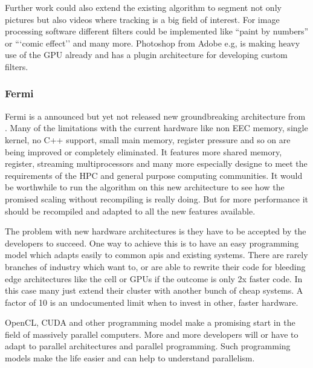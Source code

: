 Further work could also extend the existing algorithm to segment not only pictures 
but also videos where tracking is a big field of interest. For image processing
software different filters could be implemented like ``paint by numbers'' or 
```comic effect'' and many more. Photoshop  from Adobe e.g, is making heavy
use of the \gls{GPU} already and has a plugin architecture for developing custom
filters.  
 
\subsubsection{Fermi} %
\label{ssub:fermi}
Fermi is a announced but yet not released new groundbreaking architecture from
{}. Many of the limitations with the current hardware like 
non \gls{EEC} memory, single kernel, no C++ support, small main memory, register
pressure and so on are being improved or completely eliminated. It features more
shared memory, register, streaming multiprocessors and many more especially
designe to meet the requirements of the \gls{HPC} and general purpose computing
communities. It would be worthwhile to run the algorithm on this new architecture
to see how the promised scaling without recompiling is really doing. But for more
performance it should be recompiled and adapted to all the new features available.

The problem with new hardware architectures is they have to be accepted by the
developers to succeed. One way to achieve this is to have an easy programming
model which adapts easily to common apis and existing systems. There are rarely
branches of industry which want to, or are able to rewrite their code for
bleeding edge architectures like the cell or \glspl{GPU} if the outcome is only
2x faster code. In this case many just extend their cluster with another bunch
of cheap systems. A factor of 10 is an undocumented limit when to invest in
other, faster hardware.

OpenCL, \gls{CUDA} and other programming model make a promising start in the field
of massively parallel computers. More and more developers will or have to adapt to
parallel architectures and parallel programming. Such programming models make 
the life easier and can help to understand parallelism.





